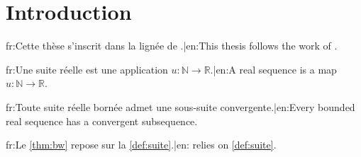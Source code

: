 \chapter{Introduction}
\label{ch:introduction}

{{fr:Cette thèse s'inscrit dans la lignée de \textcite{knuth1984}.|en:This thesis follows the work of \textcite{knuth1984}.}}

\begin{definition}\label{def:suite}
  {{fr:Une suite réelle est une application $u \colon \mathbb{N} \to \mathbb{R}$.|en:A real sequence is a map $u \colon \mathbb{N} \to \mathbb{R}$.}}
\end{definition}

\begin{theorem}\label{thm:bw}
  {{fr:Toute suite réelle bornée admet une sous-suite convergente.|en:Every bounded real sequence has a convergent subsequence.}}
\end{theorem}

{{fr:Le \cref{thm:bw} repose sur la \cref{def:suite}.|en: relies on \cref{def:suite}.}}

